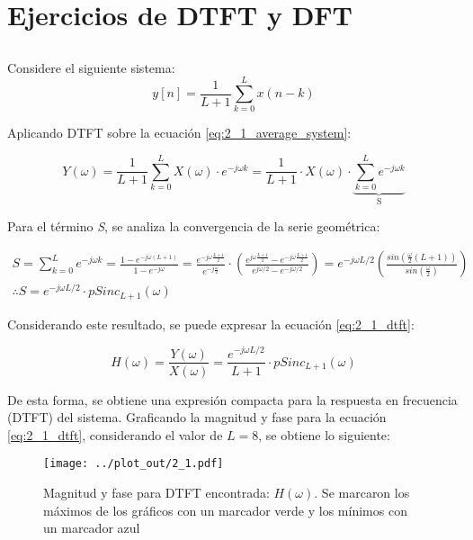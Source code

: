 \section{Ejercicios de DTFT y DFT}
	\subsection{} %
		Considere el siguiente sistema:
		\begin{equation}
			y\left[ n \right] = \frac{1}{L+1} \sum_{k = 0}^{L} x(n-k)
			\label{eq:2_1_average_system}
		\end{equation}
		
		Aplicando \textsc{DTFT} sobre la ecuación \ref{eq:2_1_average_system}:
		
		\begin{equation}
			Y(\omega) = \frac{1}{L+1} \sum_{k = 0}^{L} X(\omega) \cdot e^{-j\omega k} = \frac{1}{L+1} \cdot X(\omega) \cdot \underbrace{\sum_{k = 0}^{L} e^{-j\omega k}}_{\text{S}}
			\label{eq:2_1_dtft}
		\end{equation}
		
		Para el término \textit{S}, se analiza la convergencia de la serie geométrica:
		
		\begin{gather*}
			S = \sum_{k = 0}^{L} e^{-j\omega k} = \frac{1 - e^{-j \omega (L+1)}}{1 - e^{-j \omega}} = \frac{e^{-j\omega \frac{L+1}{2}}}{e^{-j \frac{\omega}{2}}} \cdot \left( \frac{e^{j\omega \frac{L+1}{2}} - e^{-j\omega \frac{L+1}{2}}}{e^{j \omega/2} - e^{-j \omega /2}} \right) = e^{-j \omega L / 2} \left( \frac{sin \left( \frac{\omega}{2} (L+1) \right)}{sin \left( \frac{\omega}{2} \right) } \right) \\
			\boxed{\therefore S = e^{-j \omega L /2} \cdot pSinc_{L+1}(\omega)} 
		\end{gather*}
		
		Considerando este resultado, se puede expresar la ecuación \ref{eq:2_1_dtft}:
		
		\begin{equation}
			H(\omega) = \frac{Y(\omega)}{X(\omega)} = \frac{e^{-j \omega L /2}}{L+1} \cdot pSinc_{L+1}(\omega)
		\end{equation}
		
		De esta forma, se obtiene una expresión compacta para la respuesta en frecuencia (\textsc{DTFT}) del sistema. Graficando la magnitud y fase para la ecuación \ref{eq:2_1_dtft}, considerando el valor de $L=8$, se obtiene lo siguiente:
		\begin{figure}[H]
			\center
			\texttt{[image: ../plot\_out/2\_1.pdf]}
			\caption{Magnitud y fase para \textsc{DTFT} encontrada: $H(\omega)$. Se marcaron los máximos de los gráficos con un marcador verde y los mínimos con un marcador azul}
			\label{fig:2_1_plot}
		\end{figure}
		
